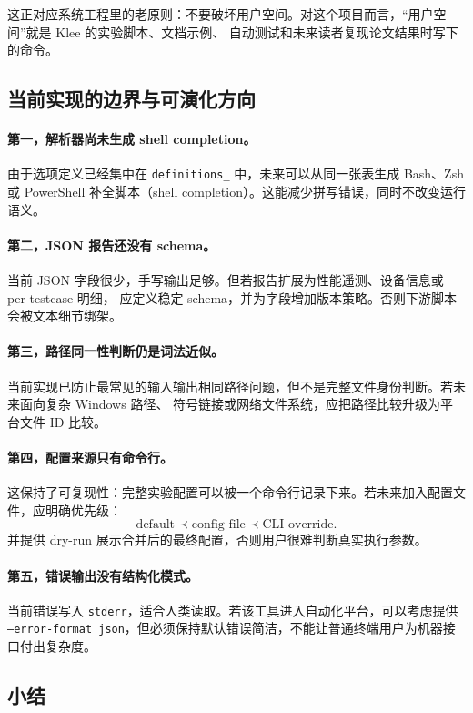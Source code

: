 这正对应系统工程里的老原则：不要破坏用户空间。对这个项目而言，“用户空间”就是 Klee 的实验脚本、文档示例、
自动测试和未来读者复现论文结果时写下的命令。

\subsection{当前实现的边界与可演化方向}

\paragraph{第一，解析器尚未生成 shell completion。}
由于选项定义已经集中在 \texttt{definitions\_} 中，未来可以从同一张表生成 Bash、Zsh 或 PowerShell
补全脚本（shell completion）。这能减少拼写错误，同时不改变运行语义。

\paragraph{第二，JSON 报告还没有 schema。}
当前 JSON 字段很少，手写输出足够。但若报告扩展为性能遥测、设备信息或 per-testcase 明细，
应定义稳定 schema，并为字段增加版本策略。否则下游脚本会被文本细节绑架。

\paragraph{第三，路径同一性判断仍是词法近似。}
当前实现已防止最常见的输入输出相同路径问题，但不是完整文件身份判断。若未来面向复杂 Windows 路径、
符号链接或网络文件系统，应把路径比较升级为平台文件 ID 比较。

\paragraph{第四，配置来源只有命令行。}
这保持了可复现性：完整实验配置可以被一个命令行记录下来。若未来加入配置文件，应明确优先级：
\[
    \text{default} \prec \text{config file} \prec \text{CLI override}.
\]
并提供 dry-run 展示合并后的最终配置，否则用户很难判断真实执行参数。

\paragraph{第五，错误输出没有结构化模式。}
当前错误写入 \texttt{stderr}，适合人类读取。若该工具进入自动化平台，可以考虑提供
\texttt{--error-format json}，但必须保持默认错误简洁，不能让普通终端用户为机器接口付出复杂度。

\subsection{小结}

